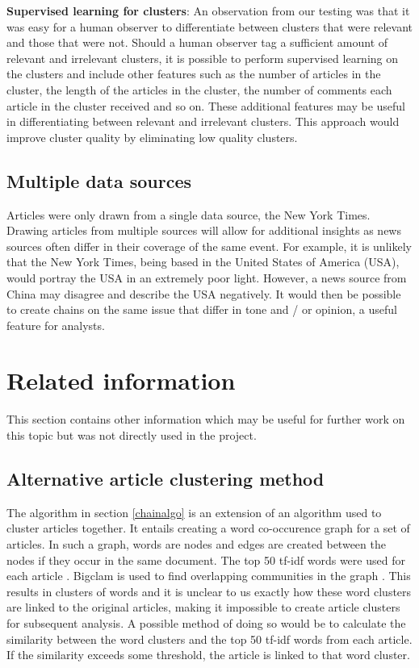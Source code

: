 \documentclass[12pt]{article}
\begin{document}
\textbf{Supervised learning for clusters}: An observation from our testing was that it was easy for a human observer to differentiate between clusters that were relevant and those that were not. Should a human observer tag a sufficient amount of relevant and irrelevant clusters, it is possible to perform supervised learning on the clusters and include other features such as the number of articles in the cluster, the length of the articles in the cluster, the number of comments each article in the cluster received and so on. These additional features may be useful in differentiating between relevant and irrelevant clusters. This approach would improve cluster quality by eliminating low quality clusters.

\subsection{Multiple data sources}
Articles were only drawn from a single data source, the New York Times. Drawing articles from multiple sources will allow for additional insights as news sources often differ in their coverage of the same event. For example, it is unlikely that the New York Times, being based in the United States of America (USA), would portray the USA in an extremely poor light. However, a news source from China may disagree and describe the USA negatively. It would then be possible to create chains on the same issue that differ in tone and / or opinion, a useful feature for analysts.


\section{Related information}
This section contains other information which may be useful for further work on this topic but was not directly used in the project.

\subsection{Alternative article clustering method}
The algorithm in section \ref{chainalgo} is an extension of an algorithm used to cluster articles together. It entails creating a word co-occurence graph for a set of articles. In such a graph, words are nodes and edges are created between the nodes if they occur in the same document. The top 50 tf-idf words were used for each article \cite{infocartography}. Bigclam is used to find overlapping communities in the graph \cite{overlapcom}. This results in clusters of words and it is unclear to us exactly how these word clusters are linked to the original articles, making it impossible to create article clusters for subsequent analysis. A possible method of doing so would be to calculate the similarity between the word clusters and the top 50 tf-idf words from each article. If the similarity exceeds some threshold, the article is linked to that word cluster.
\end{document}
